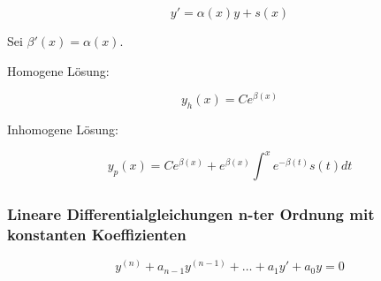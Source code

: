 \documentclass[twoside]{article}
\begin{document}
				\begin{displaymath}
					y' = \alpha(x)y + s(x)
				\end{displaymath}
				
				Sei \begin{math} \beta'(x) = \alpha(x) \end{math}.
				
				Homogene Lösung:
						
				\begin{displaymath}
					y_h(x) = Ce^{\beta(x)}
				\end{displaymath}
				
				Inhomogene Lösung:
				
				\begin{displaymath}
					y_p(x) = Ce^{\beta(x)} + e^{\beta(x)} \int_{}^{x} e^{-\beta(t)} s(t) dt
				\end{displaymath}
				
			\subsubsection{Lineare Differentialgleichungen n-ter Ordnung mit konstanten Koeffizienten}
			
				\begin{displaymath}
					y^{(n)} + a_{n-1} y^{(n-1)} + \dots + a_1 y' + a_0 y = 0
				\end{displaymath}
				
\end{document}
